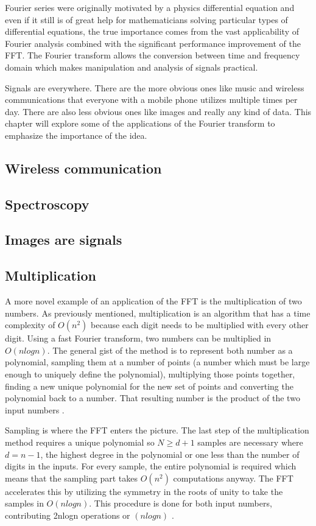 Fourier series were originally motivated by a physics differential equation and even if it still is of great help for mathematicians solving particular types of differential equations, the true importance comes from the vast applicability of Fourier analysis combined with the significant performance improvement of the FFT. The Fourier transform allows the conversion between time and frequency domain which makes manipulation and analysis of signals practical. 

Signals are everywhere. There are the more obvious ones like music and wireless communications that everyone with a mobile phone utilizes multiple times per day. There are also less obvious ones like images and really any kind of data. This chapter will explore some of the applications of the Fourier transform to emphasize the importance of the idea.

\subsection{Wireless communication}


\subsection{Spectroscopy}

\subsection{Images are signals}

\subsection{Multiplication}
A more novel example of an application of the FFT is the multiplication of two numbers. As previously mentioned, multiplication is an algorithm that has a time complexity of $O(n^2)$ because each digit needs to be multiplied with every other digit. Using a fast Fourier transform, two numbers can be multiplied in $O(nlogn)$. The general gist of the method is to represent both number as a polynomial, sampling them at a number of points (a number which must be large enough to uniquely define the polynomial), multiplying those points together, finding a new unique polynomial for the new set of points and converting the polynomial back to a number. That resulting number is the product of the two input numbers \cite{Reducible2020}.

Sampling is where the FFT enters the picture. The last step of the multiplication method requires a unique polynomial so $N \geq d+1$ samples are necessary where $d = n-1$, the highest degree in the polynomial or one less than the number of digits in the inputs. For every sample, the entire polynomial is required which means that the sampling part takes $O(n^2)$ computations anyway. The FFT accelerates this by utilizing the symmetry in the roots of unity to take the samples in $O(nlogn)$. This procedure is done for both input numbers, contributing 2nlogn operations or $(nlogn)$ \cite{Reducible2020}.

